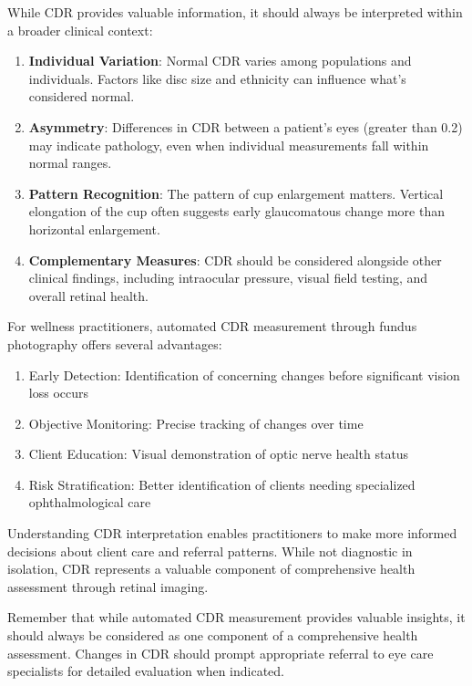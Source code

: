 \documentclass[
  Letterpaper,
]{scrbook}
\providecommand{\tightlist}{%
  \setlength{\itemsep}{0pt}\setlength{\parskip}{0pt}}\usepackage{longtable,booktabs,array}
\begin{document}
While CDR provides valuable information, it should always be interpreted
within a broader clinical context:

\begin{enumerate}
\def\labelenumi{\arabic{enumi}.}
\tightlist
\item
  \textbf{Individual Variation}: Normal CDR varies among populations and
  individuals. Factors like disc size and ethnicity can influence what's
  considered normal.
\item
  \textbf{Asymmetry}: Differences in CDR between a patient's eyes
  (greater than 0.2) may indicate pathology, even when individual
  measurements fall within normal ranges.
\item
  \textbf{Pattern Recognition}: The pattern of cup enlargement matters.
  Vertical elongation of the cup often suggests early glaucomatous
  change more than horizontal enlargement.
\item
  \textbf{Complementary Measures}: CDR should be considered alongside
  other clinical findings, including intraocular pressure, visual field
  testing, and overall retinal health.
\end{enumerate}

For wellness practitioners, automated CDR measurement through fundus
photography offers several advantages:

\begin{enumerate}
\def\labelenumi{\arabic{enumi}.}
\tightlist
\item
  Early Detection: Identification of concerning changes before
  significant vision loss occurs
\item
  Objective Monitoring: Precise tracking of changes over time
\item
  Client Education: Visual demonstration of optic nerve health status
\item
  Risk Stratification: Better identification of clients needing
  specialized ophthalmological care
\end{enumerate}

Understanding CDR interpretation enables practitioners to make more
informed decisions about client care and referral patterns. While not
diagnostic in isolation, CDR represents a valuable component of
comprehensive health assessment through retinal imaging.

Remember that while automated CDR measurement provides valuable
insights, it should always be considered as one component of a
comprehensive health assessment. Changes in CDR should prompt
appropriate referral to eye care specialists for detailed evaluation
when indicated.
\end{document}

